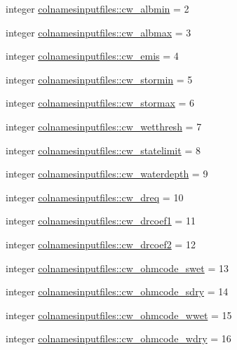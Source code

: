 \begin{DoxyCompactItemize}
\item 
integer \hyperlink{namespacecolnamesinputfiles_a3e2bab3cbac3f65034190eb40a6a720d}{colnamesinputfiles\+::cw\+\_\+albmin} = 2
\item 
integer \hyperlink{namespacecolnamesinputfiles_af2bcac281281f5be23251704befc41d6}{colnamesinputfiles\+::cw\+\_\+albmax} = 3
\item 
integer \hyperlink{namespacecolnamesinputfiles_a242bb5c78651ec63ffdb8d8ce1fb4803}{colnamesinputfiles\+::cw\+\_\+emis} = 4
\item 
integer \hyperlink{namespacecolnamesinputfiles_ab9b7bbe6f000d46892c066dc0586a9b3}{colnamesinputfiles\+::cw\+\_\+stormin} = 5
\item 
integer \hyperlink{namespacecolnamesinputfiles_afdb6de5a5e1d3f406ad7cfd67ef16f42}{colnamesinputfiles\+::cw\+\_\+stormax} = 6
\item 
integer \hyperlink{namespacecolnamesinputfiles_ae8900c6d6e9eb550cf1c702acb65dc20}{colnamesinputfiles\+::cw\+\_\+wetthresh} = 7
\item 
integer \hyperlink{namespacecolnamesinputfiles_a34c411defdc0da75fe0d6854e45b266a}{colnamesinputfiles\+::cw\+\_\+statelimit} = 8
\item 
integer \hyperlink{namespacecolnamesinputfiles_add367c34c8e4c7d6b2e3e6a1cea6d4cb}{colnamesinputfiles\+::cw\+\_\+waterdepth} = 9
\item 
integer \hyperlink{namespacecolnamesinputfiles_acf7a03c96513d8c30d986353cab6f4e4}{colnamesinputfiles\+::cw\+\_\+dreq} = 10
\item 
integer \hyperlink{namespacecolnamesinputfiles_ac4a304c5958bff88e372fa04cc7b2ed6}{colnamesinputfiles\+::cw\+\_\+drcoef1} = 11
\item 
integer \hyperlink{namespacecolnamesinputfiles_ac3abc75f657224540af00dce3e12c31a}{colnamesinputfiles\+::cw\+\_\+drcoef2} = 12
\item 
integer \hyperlink{namespacecolnamesinputfiles_af211aa34f46a1305707228ac39d36336}{colnamesinputfiles\+::cw\+\_\+ohmcode\+\_\+swet} = 13
\item 
integer \hyperlink{namespacecolnamesinputfiles_a5499ae70b69ed930772225c25bdbfda9}{colnamesinputfiles\+::cw\+\_\+ohmcode\+\_\+sdry} = 14
\item 
integer \hyperlink{namespacecolnamesinputfiles_ac191b5dba5f66714b5462d9b0f224a12}{colnamesinputfiles\+::cw\+\_\+ohmcode\+\_\+wwet} = 15
\item 
integer \hyperlink{namespacecolnamesinputfiles_ab05531176915209690e2e250c5628930}{colnamesinputfiles\+::cw\+\_\+ohmcode\+\_\+wdry} = 16

\end{DoxyCompactItemize}
